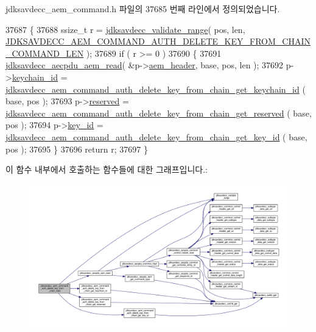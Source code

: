 jdksavdecc\+\_\+aem\+\_\+command.\+h 파일의 37685 번째 라인에서 정의되었습니다.


\begin{DoxyCode}
37687 \{
37688     ssize\_t r = \hyperlink{group__util_ga9c02bdfe76c69163647c3196db7a73a1}{jdksavdecc\_validate\_range}( pos, len, 
      \hyperlink{group__command__auth__delete__key__from__chain_ga701f74f6c66335250d7cb6bf5b6ea0fa}{JDKSAVDECC\_AEM\_COMMAND\_AUTH\_DELETE\_KEY\_FROM\_CHAIN\_COMMAND\_LEN}
       );
37689     \textcolor{keywordflow}{if} ( r >= 0 )
37690     \{
37691         \hyperlink{group__aecpdu__aem_gae2421015dcdce745b4f03832e12b4fb6}{jdksavdecc\_aecpdu\_aem\_read}( &p->\hyperlink{structjdksavdecc__aem__command__auth__delete__key__from__chain_ae1e77ccb75ff5021ad923221eab38294}{aem\_header}, base, pos, len );
37692         p->\hyperlink{structjdksavdecc__aem__command__auth__delete__key__from__chain_a10ed6547e01665c453e2a40b142f7526}{keychain\_id} = 
      \hyperlink{group__command__auth__delete__key__from__chain_ga2145326e6661b0c699a0af29109c0d31}{jdksavdecc\_aem\_command\_auth\_delete\_key\_from\_chain\_get\_keychain\_id}
      ( base, pos );
37693         p->\hyperlink{structjdksavdecc__aem__command__auth__delete__key__from__chain_a5a6ed8c04a3db86066924b1a1bf4dad3}{reserved} = 
      \hyperlink{group__command__auth__delete__key__from__chain_ga49a6f38c77bc0d0ead0b9743194297f9}{jdksavdecc\_aem\_command\_auth\_delete\_key\_from\_chain\_get\_reserved}
      ( base, pos );
37694         p->\hyperlink{structjdksavdecc__aem__command__auth__delete__key__from__chain_a37cbdf6056556ccfaee3ab01dc7c3032}{key\_id} = 
      \hyperlink{group__command__auth__delete__key__from__chain_ga00b12cbc1d1695d6a006ba72fa5a9ba2}{jdksavdecc\_aem\_command\_auth\_delete\_key\_from\_chain\_get\_key\_id}
      ( base, pos );
37695     \}
37696     \textcolor{keywordflow}{return} r;
37697 \}
\end{DoxyCode}


이 함수 내부에서 호출하는 함수들에 대한 그래프입니다.\+:
\nopagebreak
\begin{figure}[H]
\begin{center}
\leavevmode
\includegraphics[width=350pt]{group__command__auth__delete__key__from__chain_gad3136912c47d7ab8cd7a63e71f907559_cgraph}
\end{center}
\end{figure}


